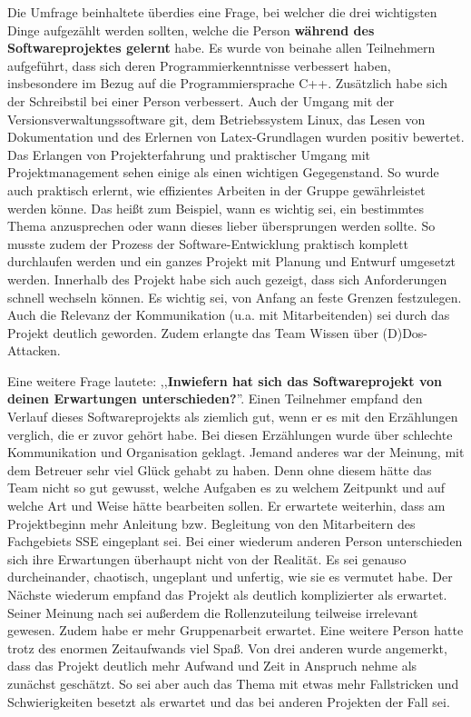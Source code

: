 \documentclass[../review_3.tex]{subfiles}
\begin{document}
Die Umfrage beinhaltete überdies eine Frage, bei welcher die drei wichtigsten Dinge aufgezählt werden sollten, welche die Person \textbf{während des Softwareprojektes gelernt} habe.
Es wurde von beinahe allen Teilnehmern aufgeführt, dass sich deren Programmierkenntnisse verbessert haben, insbesondere im Bezug auf die Programmiersprache C++. Zusätzlich habe sich der Schreibstil bei einer Person verbessert. Auch der Umgang mit der Versionsverwaltungssoftware git, dem Betriebssystem Linux, das Lesen von Dokumentation und des Erlernen von Latex-Grundlagen wurden positiv bewertet. Das Erlangen von Projekterfahrung und praktischer Umgang mit Projektmanagement sehen einige als einen wichtigen Gegegenstand. So wurde auch praktisch erlernt, wie effizientes Arbeiten in der Gruppe gewährleistet werden könne. Das heißt zum Beispiel, wann es wichtig sei, ein bestimmtes Thema anzusprechen oder wann dieses lieber übersprungen werden sollte.
So musste zudem der Prozess der Software-Entwicklung praktisch komplett durchlaufen werden und ein ganzes Projekt mit Planung und Entwurf umgesetzt werden. Innerhalb des Projekt habe sich auch gezeigt, dass sich Anforderungen schnell wechseln können. Es wichtig sei, von Anfang an feste Grenzen festzulegen. Auch die Relevanz der Kommunikation (u.a. mit Mitarbeitenden) sei durch das Projekt deutlich geworden.
Zudem erlangte das Team Wissen über (D)Dos-Attacken.

Eine weitere Frage lautete: ,,\textbf{Inwiefern hat sich das Softwareprojekt von deinen Erwartungen unterschieden?}''.
Einen Teilnehmer empfand den Verlauf dieses Softwareprojekts als ziemlich gut, wenn er es mit den Erzählungen verglich, die er zuvor gehört habe. Bei diesen Erzählungen wurde über schlechte Kommunikation und Organisation geklagt. Jemand anderes war der Meinung, mit dem Betreuer sehr viel Glück gehabt zu haben. Denn ohne diesem hätte das Team nicht so gut gewusst, welche Aufgaben es zu welchem Zeitpunkt und auf welche Art und Weise hätte bearbeiten sollen. Er erwartete weiterhin, dass am Projektbeginn mehr Anleitung bzw. Begleitung von den Mitarbeitern des Fachgebiets SSE eingeplant sei. Bei einer wiederum anderen Person unterschieden sich ihre Erwartungen überhaupt nicht von der Realität. Es sei genauso durcheinander, chaotisch, ungeplant und unfertig, wie sie es vermutet habe. Der Nächste wiederum empfand das Projekt als deutlich komplizierter als erwartet. Seiner Meinung nach sei außerdem die Rollenzuteilung teilweise irrelevant gewesen. Zudem habe er mehr Gruppenarbeit erwartet. Eine weitere Person hatte trotz des enormen Zeitaufwands viel Spaß. Von drei anderen wurde angemerkt, dass das Projekt deutlich mehr Aufwand und Zeit in Anspruch nehme als zunächst geschätzt. So sei aber auch das Thema mit etwas mehr Fallstricken und Schwierigkeiten besetzt als erwartet und das bei anderen Projekten der Fall sei.
\end{document}
